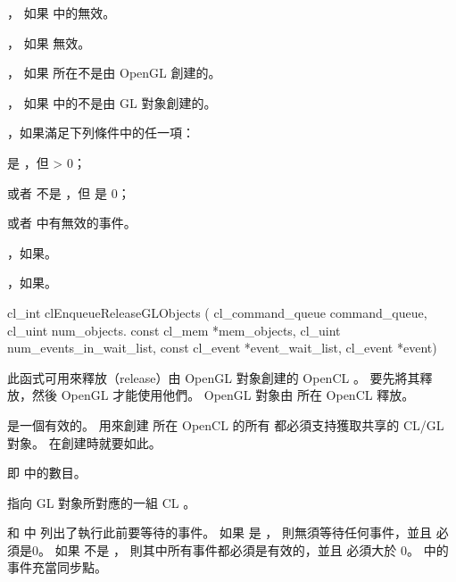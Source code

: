 \item {}，
如果  中的無效。

\item {}，
如果  無效。

\item {}，
如果  所在不是由 OpenGL 創建的。

\item {}，
如果  中的不是由 GL 對象創建的。

\startitem
{}，如果滿足下列條件中的任一項：
\startigBase
\item {} 是 ，但  > 0；
\item 或者  不是 ，但  是 0；
\item 或者  中有無效的事件。
\stopigBase
\stopitem

\item {}，如果\scdevfailres。

\item {}，如果\schostfailres。
\stopigBase


\startCLFUNC
cl_int clEnqueueReleaseGLObjects (
			cl_command_queue command_queue,
			cl_uint num_objects.
			const cl_mem *mem_objects,
			cl_uint num_events_in_wait_list,
			const cl_event *event_wait_list,
			cl_event *event)
\stopCLFUNC

此函式可用來釋放（release）由 OpenGL 對象創建的 OpenCL 。
要先將其釋放，然後 OpenGL 才能使用他們。
OpenGL 對象由  所在 OpenCL  釋放。

 是一個有效的。
用來創建  所在 OpenCL 的所有
都必須支持獲取共享的 CL/GL 對象。
在創建時就要如此。

 即  中的數目。

 指向 GL 對象所對應的一組 CL 。

 和  中
列出了執行此前要等待的事件。
如果  是 ，
則無須等待任何事件，並且  必須是0。
如果  不是 ，
則其中所有事件都必須是有效的，並且  必須大於 0。
 中的事件充當同步點。


